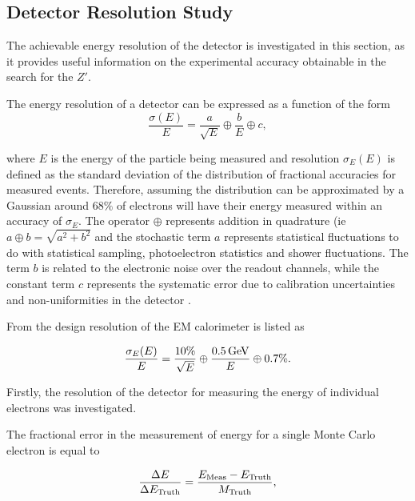 \documentclass{article}
\begin{document}
\subsection{Detector Resolution Study}
\label{sec:study_resolution}


The achievable energy resolution of the detector is investigated in this section, as it provides useful information on the experimental accuracy obtainable in the search for the $Z'$. 

The energy resolution of a detector can be expressed as a function of the form 
\begin{equation}
\label{eqn:detResolution}
\frac{\sigma(E)}{E} = \frac{a}{\sqrt{E}} \oplus \frac{b}{E} \oplus c,
\end{equation}

where $E$ is the energy of the particle being measured and resolution $\sigma_E(E)$ is defined as the standard deviation of the distribution of fractional accuracies for measured events. Therefore, assuming the distribution can be approximated by a Gaussian around $68\%$ of electrons will have their energy measured within an accuracy of $\sigma_E$.
The operator $\oplus$ represents addition in quadrature (ie $a\oplus b = \sqrt{a^2 + b^2}$ and the stochastic term $a$ represents statistical fluctuations to do with statistical sampling, photoelectron statistics and shower fluctuations. The term $b$ is related to the electronic noise over the readout channels, while the constant term $c$ represents the systematic error due to calibration uncertainties and non-uniformities in the detector \cite{PDGDetectors}.

From \cite{ATLASLARRes} the design resolution of the EM calorimeter is listed as

\begin{equation}
\frac{\sigma_E(E)}{E} = \frac{10\%}{\sqrt{E}}\oplus\frac{0.5\,\rm{GeV}}{E}\oplus0.7\%.
\end{equation}


Firstly, the resolution of the detector for measuring the energy of individual electrons was investigated. 

The fractional error in the measurement of energy for a single Monte Carlo electron is equal to

\begin{equation}
\frac{\Delta E}{\Delta E_{\rm{Truth}}} = \frac{E_{\rm{Meas}}-E_{\rm{Truth}}}{M_{\rm{Truth}}},
\end{equation}
\end{document}
